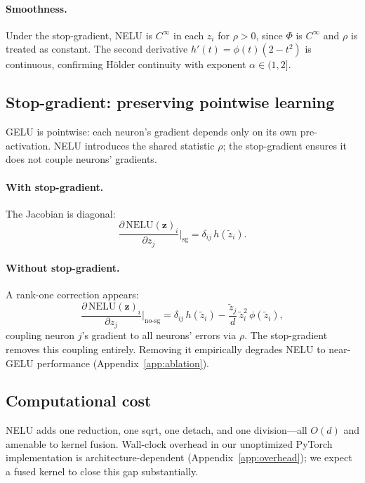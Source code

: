 \paragraph{Smoothness.}
Under the stop-gradient, NELU is $C^\infty$ in each $z_i$ for $\rho > 0$, since $\Phi$ is $C^\infty$ and $\rho$ is treated as constant.
The second derivative $h'(t) = \phi(t)(2-t^2)$ is continuous, confirming H\"older continuity with exponent $\alpha \in (1, 2]$.

\subsection{Stop-gradient: preserving pointwise learning}\label{sec:gradient}

GELU is pointwise: each neuron's gradient depends only on its own pre-activation.
NELU introduces the shared statistic $\rho$; the stop-gradient ensures it does not couple neurons' gradients.

\paragraph{With stop-gradient.}
The Jacobian is diagonal:
\begin{equation}\label{eq:jac_sg}
    \frac{\partial\,\mathrm{NELU}(\mathbf{z})_i}{\partial z_j}\bigg|_{\mathrm{sg}} = \delta_{ij}\,h(\tilde{z}_i).
\end{equation}

\paragraph{Without stop-gradient.}
A rank-one correction appears:
\begin{equation}\label{eq:jac_nosg}
    \frac{\partial\,\mathrm{NELU}(\mathbf{z})_i}{\partial z_j}\bigg|_{\text{no-sg}} = \delta_{ij}\,h(\tilde{z}_i) - \frac{\tilde{z}_j}{d}\,\tilde{z}_i^2\,\phi(\tilde{z}_i),
\end{equation}
coupling neuron $j$'s gradient to all neurons' errors via $\rho$.
The stop-gradient removes this coupling entirely.
Removing it empirically degrades NELU to near-GELU performance (Appendix~\ref{app:ablation}).

\subsection{Computational cost}\label{sec:cost}

NELU adds one reduction, one sqrt, one detach, and one division---all $O(d)$ and amenable to kernel fusion.
Wall-clock overhead in our unoptimized PyTorch implementation is architecture-dependent (Appendix~\ref{app:overhead}); we expect a fused kernel to close this gap substantially.